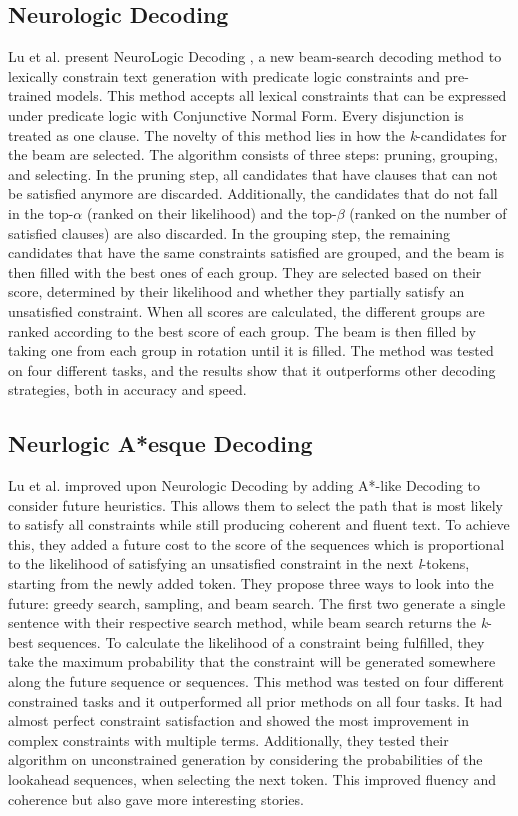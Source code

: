 \subsection{Neurologic Decoding}
Lu et al. present NeuroLogic Decoding \cite{lu_neurologic_2021}, a new beam-search decoding method to lexically constrain text generation with predicate logic constraints and pre-trained models. This method accepts all lexical constraints that can be expressed under predicate logic with Conjunctive Normal Form. Every disjunction is treated as one clause. The novelty of this method lies in how the \textit{k}-candidates for the beam are selected. The algorithm consists of three steps: pruning, grouping, and selecting. In the pruning step, all candidates that have clauses that can not be satisfied anymore are discarded. Additionally, the candidates that do not fall in the top-\(\alpha\) (ranked on their likelihood) and the top-\(\beta\) (ranked on the number of satisfied clauses) are also discarded. In the grouping step, the remaining candidates that have the same constraints satisfied are grouped, and the beam is then filled with the best ones of each group. They are selected based on their score, determined by their likelihood and whether they partially satisfy an unsatisfied constraint. When all scores are calculated, the different groups are ranked according to the best score of each group. The beam is then filled by taking one from each group in rotation until it is filled. The method was tested on four different tasks, and the results show that it outperforms other decoding strategies, both in accuracy and speed.


\subsection{Neurlogic A*esque Decoding}
Lu et al. \cite{lu_neurologic_2022} improved upon Neurologic Decoding by adding A*-like Decoding to consider future heuristics. This allows them to select the path that is most likely to satisfy all constraints while still producing coherent and fluent text. To achieve this, they added a future cost to the score of the sequences which is proportional to the likelihood of satisfying an unsatisfied constraint in the next \textit{l}-tokens, starting from the newly added token. They propose three ways to look into the future: greedy search, sampling, and beam search. The first two generate a single sentence with their respective search method, while beam search returns the \textit{k}-best sequences. To calculate the likelihood of a constraint being fulfilled, they take the maximum probability that the constraint will be generated somewhere along the future sequence or sequences. This method was tested on four different constrained tasks and it outperformed all prior methods on all four tasks. It had almost perfect constraint satisfaction and showed the most improvement in complex constraints with multiple terms. Additionally, they tested their algorithm on unconstrained generation by considering the probabilities of the lookahead sequences, when selecting the next token. This improved fluency and coherence but also gave more interesting stories. 

